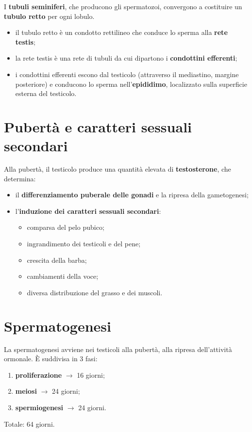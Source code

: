 I \textbf{tubuli seminiferi}, che producono gli spermatozoi, convergono a costituire un
\textbf{tubulo retto} per ogni lobulo.
\begin{itemize}
  \item il tubulo retto è un condotto rettilineo che conduce lo sperma alla \textbf{rete testis};
  \item la rete testis è una rete di tubuli da cui dipartono i \textbf{condottini efferenti};
  \item i condottini efferenti escono dal testicolo (attraverso il mediastino, margine posteriore)
    e conducono lo sperma nell'\textbf{epididimo}, localizzato sulla superficie esterna del
    testicolo.
\end{itemize}

\section{Pubertà e caratteri sessuali secondari}

Alla pubertà, il testicolo produce una quantità elevata di \textbf{testosterone}, che determina:
\begin{itemize}
  \item il \textbf{differenziamento puberale delle gonadi} e la ripresa della gametogenesi;
  \item l'\textbf{induzione dei caratteri sessuali secondari}:
  \begin{itemize}
    \item comparsa del pelo pubico;
    \item ingrandimento dei testicoli e del pene;
    \item crescita della barba;
    \item cambiamenti della voce;
    \item diversa distribuzione del grasso e dei muscoli.
  \end{itemize}
\end{itemize}

\section{Spermatogenesi}

La spermatogenesi avviene nei testicoli alla pubertà, alla ripresa dell'attività ormonale. È
suddivisa in 3 fasi:
\begin{enumerate}
  \item \textbf{proliferazione} $\rightarrow$ 16 giorni;
  \item \textbf{meiosi} $\rightarrow$ 24 giorni;
  \item \textbf{spermiogenesi} $\rightarrow$ 24 giorni.
\end{enumerate}
Totale: 64 giorni.

